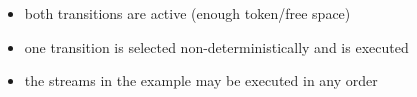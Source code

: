\begin{frame}
\begin{itemize}
\item both transitions are active (enough token/free space)
\item one transition is selected non-deterministically and is executed
\item the streams in the example may be executed in any order
\end{itemize}
\end{frame}




